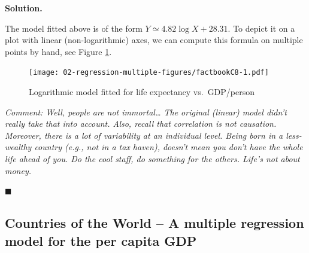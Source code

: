 \documentclass[10pt,b5paper,krantz1]{krantz}
\newenvironment{Shaded}{\begin{snugshade}}{\end{snugshade}}
\newcommand{\CommentTok}[1]{\textcolor[rgb]{0.37,0.37,0.37}{\textit{#1}}}
\newcommand{\DataTypeTok}[1]{\textcolor[rgb]{0.27,0.27,0.27}{#1}}
\newcommand{\DecValTok}[1]{\textcolor[rgb]{0.06,0.06,0.06}{#1}}
\newcommand{\KeywordTok}[1]{\textcolor[rgb]{0.27,0.27,0.27}{\textbf{#1}}}
\newcommand{\NormalTok}[1]{#1}
\newcommand{\OperatorTok}[1]{\textcolor[rgb]{0.43,0.43,0.43}{\textbf{#1}}}
\newcommand{\OtherTok}[1]{\textcolor[rgb]{0.37,0.37,0.37}{#1}}
\newcommand{\StringTok}[1]{\textcolor[rgb]{0.5,0.5,0.5}{#1}}
\newenvironment{solution}{%
\bigskip\noindent\textbf{Solution. }%
\it\ignorespaces%
\ignorespaces%
}{\ignorespaces%
\hfill$\blacksquare$%
}
\begin{document}
\begin{solution}

The model fitted above is of the form
\(Y\simeq4.82 \log X+28.31\).
To depict it on a plot with linear (non-logarithmic) axes,
we can compute this formula on multiple points by hand,
see Figure \ref{fig:factbookC8}.

\begin{Shaded}
\end{Shaded}

\begin{figure}
\hypertarget{fig:factbookC8}{%
\centering
\texttt{[image: 02-regression-multiple-figures/factbookC8-1.pdf]}
\caption{Logarithmic model fitted for life expectancy vs.~GDP/person}\label{fig:factbookC8}
}
\end{figure}

\emph{Comment: Well, people are not immortal\ldots{}
The original (linear) model didn't really take that into account.
Also, recall that correlation is not causation.
Moreover, there is a lot of variability at an individual level.
Being born in a less-wealthy country (e.g., not in a tax haven),
doesn't mean you don't have the whole life ahead of you.
Do the cool staff, do something for the others. Life's not about money.}

\end{solution}

\hypertarget{countries-of-the-world-a-multiple-regression-model-for-the-per-capita-gdp}{%
\subsection{Countries of the World -- A multiple regression model for the per capita GDP}\label{countries-of-the-world-a-multiple-regression-model-for-the-per-capita-gdp}}
\end{document}
